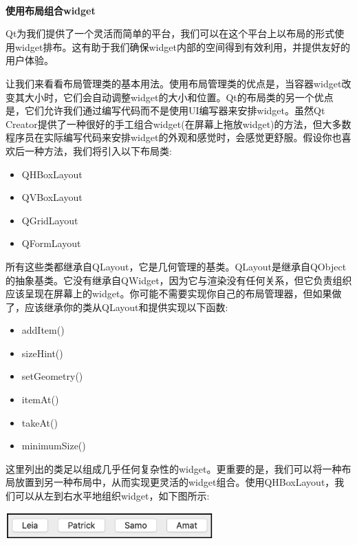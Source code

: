 \noindent\textbf{}\ \par
\textbf{使用布局组合widget} \ \par
Qt为我们提供了一个灵活而简单的平台，我们可以在这个平台上以布局的形式使用widget排布。这有助于我们确保widget内部的空间得到有效利用，并提供友好的用户体验。 \par
让我们来看看布局管理类的基本用法。使用布局管理类的优点是，当容器widget改变其大小时，它们会自动调整widget的大小和位置。Qt的布局类的另一个优点是，它们允许我们通过编写代码而不是使用UI编写器来安排widget。虽然Qt Creator提供了一种很好的手工组合widget(在屏幕上拖放widget)的方法，但大多数程序员在实际编写代码来安排widget的外观和感觉时，会感觉更舒服。假设你也喜欢后一种方法，我们将引入以下布局类: \par

\begin{itemize}
	\item QHBoxLayout
	\item QVBoxLayout
	\item QGridLayout
	\item QFormLayout
\end{itemize}

所有这些类都继承自QLayout，它是几何管理的基类。QLayout是继承自QObject的抽象基类。它没有继承自QWidget，因为它与渲染没有任何关系，但它负责组织应该呈现在屏幕上的widget。你可能不需要实现你自己的布局管理器，但如果做了，应该继承你的类从QLayout和提供实现以下函数: \par

\begin{itemize}
	\item addItem()
	\item sizeHint()
	\item setGeometry()
	\item itemAt()
	\item takeAt()
	\item minimumSize()
\end{itemize}

这里列出的类足以组成几乎任何复杂性的widget。更重要的是，我们可以将一种布局放置到另一种布局中，从而实现更灵活的widget组合。使用QHBoxLayout，我们可以从左到右水平地组织widget，如下图所示: \par

\begin{center}
	\includegraphics[width=0.6\textwidth]{content/Section-2/Chapter-14/16}
\end{center}

